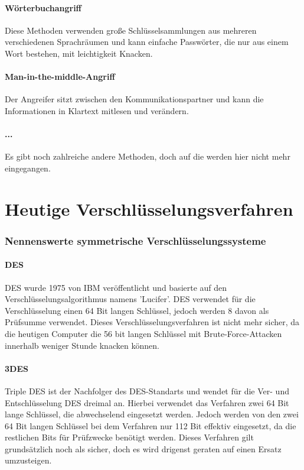 \documentclass[12pt,a4paper]{report}
\begin{document}
\paragraph{Wörterbuchangriff} Diese Methoden verwenden große Schlüsselsammlungen aus mehreren verschiedenen Sprachräumen und kann einfache Passwörter, die nur aus einem Wort bestehen, mit leichtigkeit Knacken.

\paragraph{Man-in-the-middle-Angriff} Der Angreifer sitzt zwischen den Kommunikationspartner und kann die Informationen in Klartext mitlesen und verändern.

\paragraph{...} Es gibt noch zahlreiche andere Methoden, doch auf die werden hier nicht mehr eingegangen. 

\section{Heutige Verschlüsselungsverfahren}

\subsubsection{Nennenswerte symmetrische Verschlüsselungssysteme}

\paragraph{DES}

DES wurde 1975 von IBM veröffentlicht und basierte auf den Verschlüsselungsalgorithmus namens 'Lucifer'. DES verwendet für die Verschlüsselung einen 64 Bit langen Schlüssel, jedoch werden 8 davon als Prüfsumme verwendet. Dieses Verschlüsselungsverfahren ist nicht mehr sicher, da die heutigen Computer die 56 bit langen Schlüssel mit Brute-Force-Attacken innerhalb weniger Stunde knacken können.

\paragraph{3DES}

Triple DES ist der Nachfolger des DES-Standarts und wendet für die Ver- und Entschlüsselung DES dreimal an. Hierbei verwendet das Verfahren zwei 64 Bit lange Schlüssel, die abwechselend eingesetzt werden. Jedoch werden von den zwei 64 Bit langen Schlüssel bei dem Verfahren nur 112 Bit effektiv eingesetzt, da die restlichen Bits für Prüfzwecke benötigt werden. Dieses Verfahren gilt grundsätzlich noch als sicher, doch es wird drigenst geraten auf einen Ersatz umzusteigen.
\end{document}
